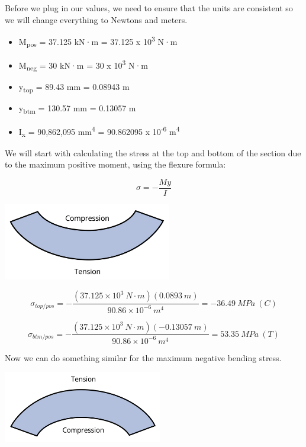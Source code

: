 \documentclass[
  letterpaper,
  DIV=11,
  numbers=noendperiod]{scrreprt}
\theoremstyle{definition}
\theoremstyle{remark}
\begin{document}
\begin{tcolorbox}
\begin{tcolorbox}
Before we plug in our values, we need to ensure that the units are
consistent so we will change everything to Newtons and meters.

\begin{itemize}
\item
  M\textsubscript{pos} = 37.125 kN·m = 37.125 x 10\textsuperscript{3}
  N·m
\item
  M\textsubscript{neg} = 30 kN·m = 30 x 10\textsuperscript{3} N·m
\item
  y\textsubscript{top} = 89.43 mm = 0.08943 m
\item
  y\textsubscript{btm} = 130.57 mm = 0.13057 m
\item
  I\textsubscript{x} = 90,862,095 mm\textsuperscript{4} = 90.862095 x
  10\textsuperscript{-6} m\textsuperscript{4}
\end{itemize}

We will start with calculating the stress at the top and bottom of the
section due to the maximum positive moment, using the flexure formula:

\[ \sigma=-\frac{M y}{I} \]

\begin{center}
\includegraphics[width=2.89583in,height=\textheight]{images/CH9 PNGs/Example 9.2 part 6.png}
\end{center}

\[ \sigma_{top/pos}=-\frac{\left(37.125 \times 10^3{~N}\cdot{m}\right)(0.0893 {~m})}{90.86 \times 10^{-6}{~m}^4}=-36.49{~MPa~(C)} \]

\[ \sigma_{btm/pos}=-\frac{\left(37.125\times10^3{~N}\cdot{m}\right)(-0.13057{~m})}{90.86 \times 10^{-6}{~m}^4}=53.35{~MPa}{~(T)} \]

Now we can do something similar for the maximum negative bending stress.

\begin{center}
\includegraphics[width=2.72917in,height=\textheight]{images/CH9 PNGs/Example 9.2 part 7.png}
\end{center}


\end{tcolorbox}
\end{tcolorbox}
\end{document}

